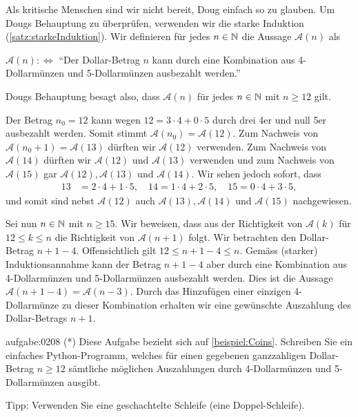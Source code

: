 {Als kritische Menschen sind wir nicht bereit, Doug einfach so zu glauben. Um Dougs Behauptung zu überprüfen, verwenden wir die starke Induktion (\cref{satz:starkeInduktion}). Wir definieren für jedes $n\in\mathbb{N}$ die Aussage $\mathcal{A}(n)$ als
\begin{center}
    $\mathcal{A}(n) :\iff $ \enquote{Der Dollar-Betrag $n$ kann durch eine Kombination aus 4-Dollarmünzen und 5-Dollarmünzen ausbezahlt werden.}
\end{center}
Dougs Behauptung besagt also, dass $\mathcal{A}(n)$ für jedes $n\in\mathbb{N}$ mit $n\geq 12$ gilt.

Der Betrag $n_0 = 12$ kann wegen $12 = 3\cdot 4 + 0\cdot 5$ durch drei 4er und null 5er ausbezahlt werden. Somit stimmt $\mathcal{A}(n_0)=\mathcal{A}(12)$. Zum Nachweis von $\mathcal{A}(n_0+1)=\mathcal{A}(13)$ dürften wir $\mathcal{A}(12)$ verwenden. Zum Nachweis von $\mathcal{A}(14)$ dürften wir $\mathcal{A}(12)$ und $\mathcal{A}(13)$ verwenden und zum Nachweis von $\mathcal{A}(15)$ gar $\mathcal{A}(12), \mathcal{A}(13)$ und $\mathcal{A}(14)$. Wir sehen jedoch sofort, dass
\begin{align*}
    13 &= 2\cdot 4 + 1\cdot 5, \quad 14 = 1\cdot 4 + 2\cdot 5, \quad 15 = 0\cdot 4 + 3\cdot 5,
\end{align*}
und somit sind nebst $\mathcal{A}(12)$ auch $\mathcal{A}(13), \mathcal{A}(14)$ und $\mathcal{A}(15)$ nachgewiesen.

Sei nun $n\in\mathbb{N}$ mit $n\geq 15$. Wir beweisen, dass aus der Richtigkeit von $\mathcal{A}(k)$ für $12\leq k \leq n$ die Richtigkeit von $\mathcal{A}(n+1)$ folgt. Wir betrachten den Dollar-Betrag $n+1-4$. Offensichtlich gilt $12\leq n+1-4\leq n$. Gemäss (starker) Induktionsannahme kann der Betrag $n+1-4$ aber durch eine Kombination aus 4-Dollarmünzen und 5-Dollarmünzen ausbezahlt werden. Dies ist die Aussage $\mathcal{A}(n+1-4) = \mathcal{A}(n-3)$. Durch das Hinzufügen einer einzigen 4-Dollarmünze zu dieser Kombination erhalten wir eine gewünschte Auszahlung des Dollar-Betrags $n+1$.
}

\begin{aufgabe}{aufgabe:0208}
(*) Diese Aufgabe bezieht sich auf \cref{beispiel:Coins}. Schreiben Sie ein einfaches Python-Programm, welches für einen gegebenen ganzzahligen Dollar-Betrag $n\geq 12$ sämtliche möglichen Auszahlungen durch 4-Dollarmünzen und 5-Dollarmünzen ausgibt.

\noindent
Tipp: Verwenden Sie eine geschachtelte Schleife (eine Doppel-Schleife).
\end{aufgabe}

